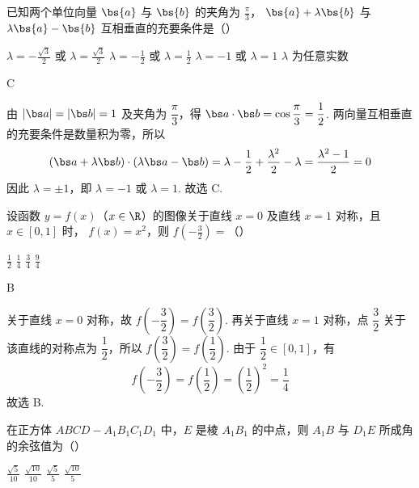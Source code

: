 \begin{problem}
已知两个单位向量 \(\bs{a}\) 与 \(\bs{b}\) 的夹角为 \( \frac{\pi}{3} \)， \(\bs{a} + \lambda \bs{b} \) 与 \(\lambda \bs{a} - \bs{b} \) 互相垂直的充要条件是（\quad）

\choices
    {\( \lambda = -\frac{\sqrt{3}}{2} \) 或 \( \lambda = \frac{\sqrt{3}}{2} \)}
    {\( \lambda = -\frac{1}{2} \) 或 \( \lambda = \frac{1}{2} \)}
    {\( \lambda = -1 \) 或 \( \lambda = 1 \)}
    {\( \lambda \) 为任意实数}
\end{problem}

\begin{answer}
C
\end{answer}

\begin{solution}
由 \(|\bs a|=|\bs b|=1\) 及夹角为 \(\dfrac\pi3\)，得 \(\bs a\cdot\bs b=\cos\dfrac\pi3=\dfrac12\). 两向量互相垂直的充要条件是数量积为零，所以
\[
(\bs a+\lambda\bs b)\cdot(\lambda\bs a-\bs b)=\lambda-\frac12+\frac{\lambda^2}{2}-\lambda=\frac{\lambda^2-1}{2}=0
\]
因此 \(\lambda=\pm1\)，即 \(\lambda=-1\) 或 \(\lambda=1\). 故选 C.
\end{solution}

\begin{problem}
设函数 \( y = f(x) \)（\( x \in \R \)）的图像关于直线 \(x = 0\) 及直线 \(x = 1\) 对称，且 \( x \in [0,1] \) 时， \( f(x) = x^2 \)，则 \( f\left(-\frac{3}{2}\right) = \)（\quad）

\choices
    {\( \frac{1}{2} \)}
    {\( \frac{1}{4} \)}
    {\( \frac{3}{4} \)}
    {\( \frac{9}{4} \)}
\end{problem}

\begin{answer}
B
\end{answer}

\begin{solution}
关于直线 \(x=0\) 对称，故 \(f\left(-\dfrac32\right)=f\left(\dfrac32\right)\). 再关于直线 \(x=1\) 对称，点 \(\dfrac32\) 关于该直线的对称点为 \(\dfrac12\)，所以 \(f\left(\dfrac32\right)=f\left(\dfrac12\right)\). 由于 \(\dfrac12\in[0,1]\)，有
\[
f\left(-\frac32\right)=f\left(\frac12\right)=\left(\frac12\right)^2=\frac14
\]
故选 B.
\end{solution}

\begin{problem}
在正方体 \( ABCD-A_{1}B_{1}C_{1}D_{1} \) 中，\(E\) 是棱 \(A_{1}B_{1}\) 的中点，则 \(A_{1}B\) 与 \(D_{1}E\) 所成角的余弦值为（\quad）

\choices
    {\( \frac{\sqrt{5}}{10} \)}
    {\( \frac{\sqrt{10}}{10} \)}
    {\( \frac{\sqrt{5}}{5} \)}
    {\( \frac{\sqrt{10}}{5} \)}
\end{problem}

